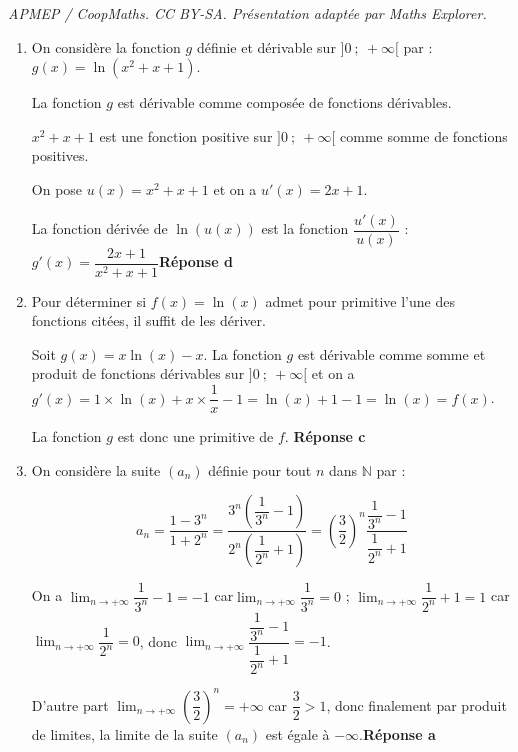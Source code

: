 \documentclass[10pt]{article}
\providecommand{\N}{\mathbb{N}}
\begin{document}
\noindent\textit{APMEP / CoopMaths. CC BY-SA. Présentation adaptée par Maths Explorer.}\par\medskip
\medskip







\begin{enumerate}
\item On considère  la fonction $g$ définie et dérivable sur $]0~;~+ \infty[$ par :
$g(x) = \ln \left(x^2 + x + 1\right).$

La fonction $g$ est dérivable comme composée de fonctions dérivables.

$x^2+x+1$ est une fonction positive sur $]0~;~+\infty[$ comme somme de fonctions positives.

On pose $u(x)=x^2+x+1$ et on a $u'(x)=2x+1$.

La fonction  dérivée de $\ln (u(x))$ est la fonction $\dfrac{u'(x)}{u(x)}$ : $g'(x) = \dfrac{2x + 1}{x^2 + x + 1}$\hfill\textbf{Réponse d}

\item 
Pour déterminer si $f(x)=\ln(x)$ admet pour primitive l'une des fonctions citées, il suffit de les dériver.

Soit $g(x) = x\ln (x)- x$.
La fonction $g$ est dérivable comme somme et produit de fonctions dérivables sur $]0~;~+ \infty[$ et on a $g'(x)=1\times \ln(x)+x\times \dfrac{1}{x} - 1= \ln (x) + 1- 1 = \ln(x) = f(x)$.

La fonction $g$ est donc une primitive de $f$. \hfill \textbf{Réponse c}

\item On considère la suite $\left(a_n\right)$ définie  pour tout $n$ dans $\N$ par :

\[a_n = \dfrac{1 - 3^n}{1 + 2^n}=\dfrac{3^n\left(\dfrac{1}{3^n}-1\right)}{2^n\left(\dfrac{1}{2^n}+1\right)}=\left(\dfrac{3}{2}\right)^n \dfrac{\dfrac{1}{3^n}-1}{\dfrac{1}{2^n}+1}\]

On a 
$\displaystyle\lim_{n \to + \infty} \dfrac{1}{3^n}-1=-1$ car$\displaystyle\lim_{n \to + \infty}\dfrac{1}{3^n}=0$ ; $\displaystyle\lim_{n \to + \infty} \dfrac{1}{2^n}+1=1$ car$\displaystyle\lim_{n \to + \infty}\dfrac{1}{2^n}=0$, donc $\displaystyle\lim_{n \to + \infty}\dfrac{\dfrac{1}{3^n} - 1}{\dfrac{1}{2^n} + 1} = - 1$.

D'autre part  $\displaystyle\lim_{n \to + \infty} \left(\dfrac{3}{2}\right)^n=+\infty$ car  $\dfrac{3}{2}> 1$, donc finalement par produit de limites, la limite de la suite $\left(a_n\right)$ est égale à $-\infty$.\hfill\textbf{Réponse a}


\end{enumerate}
\end{document}
